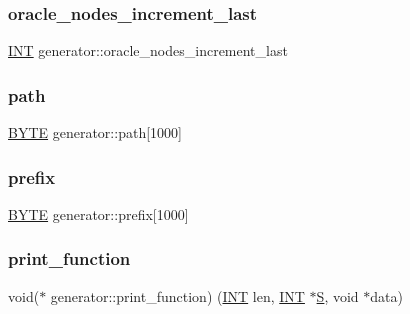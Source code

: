 \mbox{\label{classgenerator_a6783cc1c6b616560b9861d92f7570db6}} 
\subsubsection{\texorpdfstring{oracle\+\_\+nodes\+\_\+increment\+\_\+last}{oracle\_nodes\_increment\_last}}
{\footnotesize\ttfamily \mbox{\hyperlink{galois_8h_a09fddde158a3a20bd2dcadb609de11dc}{I\+NT}} generator\+::oracle\+\_\+nodes\+\_\+increment\+\_\+last}

\mbox{\label{classgenerator_af16790efe4f3dae71a9be4cc46abae8a}} 
\subsubsection{\texorpdfstring{path}{path}}
{\footnotesize\ttfamily \mbox{\hyperlink{galois_8h_ab6cc7b4aeb6ea31aba2b3fbfc83ff5e6}{B\+Y\+TE}} generator\+::path\mbox{[}1000\mbox{]}}

\mbox{\label{classgenerator_a35b7e77dabb2253694dce7114827f958}} 
\subsubsection{\texorpdfstring{prefix}{prefix}}
{\footnotesize\ttfamily \mbox{\hyperlink{galois_8h_ab6cc7b4aeb6ea31aba2b3fbfc83ff5e6}{B\+Y\+TE}} generator\+::prefix\mbox{[}1000\mbox{]}}

\mbox{\label{classgenerator_a4ae8750633bf5ad4b26734187d8cf90b}} 
\subsubsection{\texorpdfstring{print\+\_\+function}{print\_function}}
{\footnotesize\ttfamily void($\ast$ generator\+::print\+\_\+function) (\mbox{\hyperlink{galois_8h_a09fddde158a3a20bd2dcadb609de11dc}{I\+NT}} len, \mbox{\hyperlink{galois_8h_a09fddde158a3a20bd2dcadb609de11dc}{I\+NT}} $\ast$\mbox{\hyperlink{classgenerator_a5d2b65e2bd0e451744af1a47ba00bd96}{S}}, void $\ast$data)}

